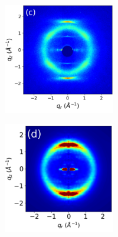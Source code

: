 \documentclass[journal=jpcbfk,manuscript=article]{achemso}
\begin{document}
\begin{figure}[!htb]
\begin{subfigure}{0.905\textwidth}
\begin{subfigure}{0.28\linewidth}
\begin{subfigure}{\textwidth}
			\end{subfigure}
	\end{subfigure}
	\begin{subfigure}{0.4\linewidth}
	\centering
			\begin{subfigure}{\textwidth}
		       		\centering
	        		\includegraphics[width=\linewidth]{WAXS_raw_jet_nocbar.pdf}
			\end{subfigure}
	\end{subfigure}
	\begin{subfigure}{0.28\linewidth}
	\centering
			\begin{subfigure}{\textwidth}
			\centering
		        	\includegraphics[width=\linewidth]{rzplot_offset_300K_jet_nocbar.pdf}

\end{subfigure}
\end{subfigure}
\end{subfigure}
\end{figure}
\end{document}
